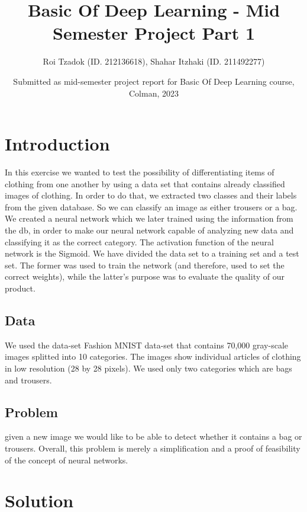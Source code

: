 \documentclass{article}
\title{Basic Of Deep Learning - Mid Semester Project Part 1}
\author{Roi Tzadok (ID. 212136618), Shahar Itzhaki (ID. 211492277)}
\date{Submitted as mid-semester project report for Basic Of Deep Learning course, Colman, 2023}
\begin{document}
\graphicspath{ {./images/} }

\maketitle

\section{Introduction}

In this exercise we wanted to test the possibility of differentiating items of clothing from one another by using a  data set that contains already classified images of clothing.
\newline
In order to do that, we extracted two classes and their labels from the given database. So we can classify an image as either trousers or a bag.
\newline
We created a neural network which we later trained using the information from the db, in order to make our neural network capable of analyzing new data and classifying it as the correct category.
\newline
The activation function of the neural network is the Sigmoid. We have divided the data set to a training set and a test set. The former was used to train the network (and therefore, used to set the correct weights), while the latter’s purpose was to evaluate the quality of our product.


\subsection{Data}
We used the data-set Fashion MNIST data-set that contains 70,000 gray-scale images splitted into 10 categories. The images show individual articles of clothing in low resolution (28 by 28 pixels).
\newline
We used only two categories which are bags and trousers.

\subsection{Problem}
given a new image we would like to be able to detect whether it contains a bag or trousers. Overall, this problem is merely a simplification and a proof of feasibility of the concept of neural networks.


\section{Solution}
\end{document}
